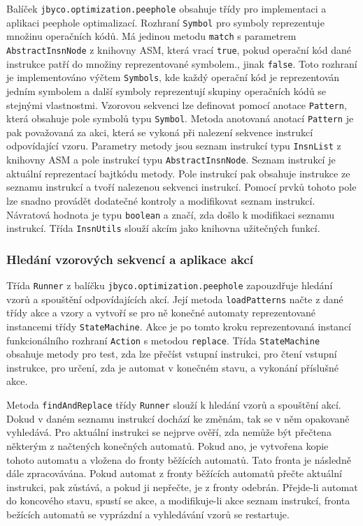 Balíček \texttt{jbyco.optimization.peephole} obsahuje třídy pro implementaci a aplikaci peephole optimalizací. Rozhraní \texttt{Symbol} pro symboly reprezentuje množinu operačních kódů. Má jedinou metodu \texttt{match} s parametrem \texttt{AbstractInsnNode} z knihovny ASM, která vrací \texttt{true}, pokud operační kód dané instrukce patří do množiny reprezentované symbolem., jinak \texttt{false}. Toto rozhraní je implementováno výčtem \texttt{Symbols}, kde každý operační kód je reprezentován jedním symbolem a další symboly reprezentují skupiny operačních kódů se stejnými vlastnostmi. Vzorovou sekvenci lze definovat pomocí anotace \texttt{Pattern}, která obsahuje pole symbolů typu \texttt{Symbol}. Metoda anotovaná anotací \texttt{Pattern} je pak považovaná za akci, která se vykoná při nalezení sekvence instrukcí odpovídající vzoru. Parametry metody jsou seznam instrukcí typu \texttt{InsnList} z knihovny ASM a pole instrukcí typu \texttt{AbstractInsnNode}. Seznam instrukcí je aktuální reprezentací bajtkódu metody. Pole instrukcí pak obsahuje instrukce ze seznamu instrukcí a tvoří nalezenou sekvenci instrukcí. Pomocí prvků tohoto pole lze snadno provádět dodatečné kontroly a modifikovat seznam instrukcí. Návratová hodnota je typu \texttt{boolean} a značí, zda došlo k modifikaci seznamu instrukcí. Třída \texttt{InsnUtils} slouží akcím jako knihovna užitečných funkcí.

\subsubsection{Hledání vzorových sekvencí a aplikace akcí}

Třída \texttt{Runner} z balíčku \texttt{jbyco.optimization.peephole} zapouzdřuje hledání vzorů a spouštění odpovídajících akcí. Její metoda \texttt{loadPatterns} načte z dané třídy akce a vzory a vytvoří se pro ně konečné automaty reprezentované instancemi třídy \texttt{StateMachine}. Akce je po tomto kroku reprezentovaná instancí funkcionálního rozhraní \texttt{Action} s metodou \texttt{replace}. Třída \texttt{StateMachine} obsahuje metody pro test, zda lze přečíst vstupní instrukci, pro čtení vstupní instrukce, pro určení, zda je automat v konečném stavu, a vykonání příslušné akce. 

Metoda \texttt{findAndReplace} třídy \texttt{Runner} slouží k hledání vzorů a spouštění akcí. Dokud v daném seznamu instrukcí dochází ke změnám, tak se v něm opakovaně vyhledává. Pro aktuální instrukci se nejprve ověří, zda nemůže být přečtena některým z načtených konečných automatů. Pokud ano, je vytvořena kopie tohoto automatu a vložena do fronty běžících automatů. Tato fronta je následně dále zpracovávána. Pokud automat z fronty běžících automatů přečte aktuální instrukci, pak zůstává, a pokud ji nepřečte, je z fronty odebrán. Přejde-li automat do koncového stavu, spustí se akce, a modifikuje-li akce seznam instrukcí, fronta bežících automatů se vyprázdní a vyhledávání vzorů se restartuje.

